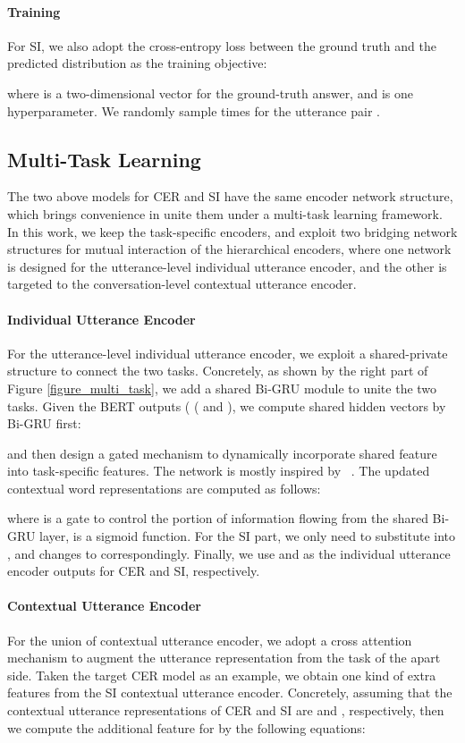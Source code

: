 \documentclass{article}
\def\newcite#1{\citeauthor{#1}~\shortcite{#1}}
\begin{document}
\begin{CJK}{UTF8}{gbsn}
\paragraph{Training}
For SI, we also adopt the cross-entropy loss between the ground truth and the predicted distribution as the training objective:

where  is a two-dimensional vector for the ground-truth answer, and  is one hyperparameter. We randomly sample  times for the utterance pair .

\subsection{Multi-Task Learning}
The two above models for CER and SI have the same encoder network structure,
which brings convenience in unite them under a multi-task learning framework.
In this work, we keep the task-specific encoders, and exploit two bridging network structures for mutual interaction of the hierarchical encoders,
where one network is designed for the utterance-level individual utterance encoder,
and the other is targeted to the conversation-level contextual  utterance  encoder.



\paragraph{Individual Utterance Encoder} 
For the utterance-level individual utterance encoder, we exploit a shared-private structure to connect the two tasks.
Concretely, as shown by the right part of Figure \ref{figure_multi_task},
we add a shared Bi-GRU module to unite the two tasks.
Given the BERT outputs  ( ( and ),
we compute shared hidden vectors by Bi-GRU first:

and then design a gated mechanism to dynamically incorporate shared feature  into task-specific features.
The network is mostly inspired by \newcite{wu2019different}.
The updated contextual word representations are computed as follows:

where  is a gate to control the portion of information flowing from the  shared Bi-GRU layer,  is a sigmoid function.
For the SI part, we only need to substitute  into ,
and  changes to  correspondingly.
Finally, we use   and  as the individual utterance encoder outputs for CER and SI, respectively. 






\paragraph{Contextual  Utterance  Encoder}
For the  union of contextual  utterance  encoder,
we adopt a cross attention mechanism to augment the utterance representation from the task of the apart side.
Taken the target CER model as an example,
we obtain one kind of extra features from the SI contextual utterance encoder. 
Concretely, assuming that the contextual utterance representations of  CER and SI 
are  and , respectively,
then we compute the additional feature for  by the following equations:


\end{CJK}
\end{document}
